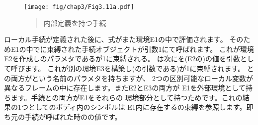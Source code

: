 \begin{figure}[tb]
\label{Figure 3.11}
\centering
\begin{comment}
\heading{Figure 3.11:} \code{Sqrt} procedure with internal definitions.

\begin{example}
          +--------------------------------------------------+
global -->| sqrt: --+                                        |
env       |         |                                        |
          +---------|----------------------------------------+
                    V       ^                   ^
                .---.---.   |                   |
     +----------+-O | O-+---+        +----------+------------+
     |          `---^---'            | x: 2                  |
     V                         E1 -->| good-enough?: -+      |
parameters: x                        | improve: ...   |      |
body: (define good-enough? ...)      | sqrt-iter: ... |      |
      (define improve ...)           +----------------|------+
      (define sqrt-iter ...)          ^  ^            |     ^
      (sqrt-iter 1.0)                 |  |            V     |
                            +---------++ |        .---.---. |
                      E2 -->| guess: 1 | |        | O | O-+-+
                            +----------+ |        `-|-^---'
                      call to sqrt-iter  |          |
                                         |          V
                               +---------++    parameters: guess
                         E3 -->| guess: 1 |    body: (< (abs ...)
                               +----------+             ...)
                         call to good-enough?
\end{example}
\end{comment}
\texttt{[image: fig/chap3/Fig3.11a.pdf]}
\begin{quote}
 内部定義を持つ手続
\end{quote}
\end{figure}


\noindent
ローカル手続が定義された後に、式がまた環境E1の中で評価されます。
そのためE1の中でに束縛された手続オブジェクトが引数1にて呼ばれます。
これが環境E2を作成しのパラメタであるが1に束縛される。
は次にを(E2の)の値を引数として呼びます。
これが別の環境E3を構築し(の引数である)が1に束縛されます。
との両方がという名前のパラメタを持ちますが、
2つの区別可能なローカル変数が異なるフレームの中に存在します。またE2とE3の両方が
E1を外部環境として持ちます。手続との両方がE1をそれらの
環境部分として持つためです。これの結果の1つとしてのボディ内のシンボルは
E1内に存在するの束縛を参照します。即ち元の手続が呼ばれた時のの値です。


